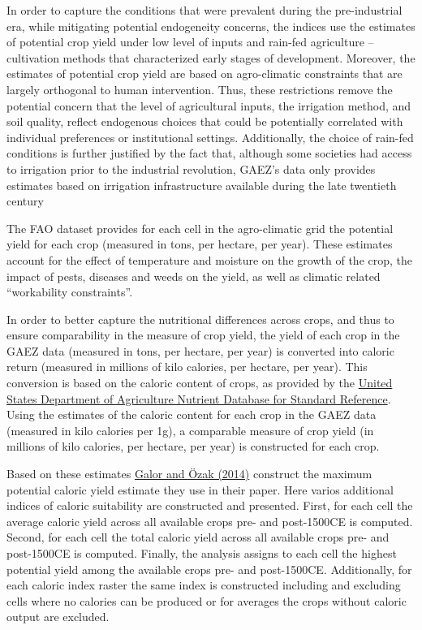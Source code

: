 \documentclass{article}
\begin{document}
In order to capture the conditions that were prevalent during the
pre-industrial era, while mitigating potential endogeneity concerns, the
indices use the estimates of potential crop yield under low level of
inputs and rain-fed agriculture -- cultivation methods that
characterized early stages of development. Moreover, the estimates of
potential crop yield are based on agro-climatic constraints that are
largely orthogonal to human intervention. Thus, these restrictions
remove the potential concern that the level of agricultural inputs, the
irrigation method, and soil quality, reflect endogenous choices that
could be potentially correlated with individual preferences or
institutional settings. Additionally, the choice of rain-fed conditions
is further justified by the fact that, although some societies had
access to irrigation prior to the industrial revolution, GAEZ's data
only provides estimates based on irrigation infrastructure available
during the late twentieth century

The FAO dataset provides for each cell in the agro-climatic grid the
potential yield for each crop (measured in tons, per hectare, per year).
These estimates account for the effect of temperature and moisture on
the growth of the crop, the impact of pests, diseases and weeds on the
yield, as well as climatic related ``workability constraints''.

In order to better capture the nutritional differences across crops, and
thus to ensure comparability in the measure of crop yield, the yield of
each crop in the GAEZ data (measured in tons, per hectare, per year) is
converted into caloric return (measured in millions of kilo calories,
per hectare, per year). This conversion is based on the caloric content
of crops, as provided by the
\href{http://www.ars.usda.gov/Services/docs.htm?docid=23635}{United
States Department of Agriculture Nutrient Database for Standard
Reference}. Using the estimates of the caloric content for each crop in
the GAEZ data (measured in kilo calories per 1g), a comparable measure
of crop yield (in millions of kilo calories, per hectare, per year) is
constructed for each crop.

Based on these estimates
\href{https://ideas.repec.org/p/smu/ecowpa/1407.html}{Galor and Özak
(2014)} construct the maximum potential caloric yield estimate they use
in their paper. Here varios additional indices of caloric suitability
are constructed and presented. First, for each cell the average caloric
yield across all available crops pre- and post-1500CE is computed.
Second, for each cell the total caloric yield across all available crops
pre- and post-1500CE is computed. Finally, the analysis assigns to each
cell the highest potential yield among the available crops pre- and
post-1500CE. Additionally, for each caloric index raster the same index
is constructed including and excluding cells where no calories can be
produced or for averages the crops without caloric output are excluded.
\end{document}
